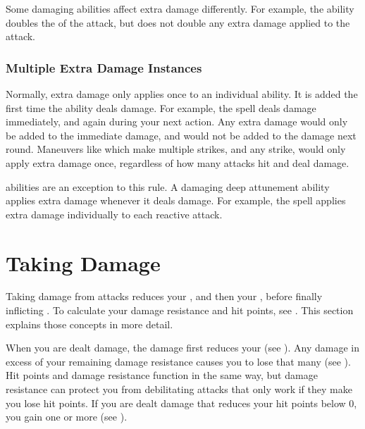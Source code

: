             Some damaging abilities affect extra damage differently.
            For example, the  ability doubles the  of the attack, but does not double any extra damage applied to the attack.

            \subsubsection{Multiple Extra Damage Instances}
                Normally, extra damage only applies once to an individual ability.
                It is added the first time the ability deals damage.
                For example, the  spell deals damage immediately, and again during your next action.
                Any extra damage would only be added to the immediate damage, and would not be added to the damage next round.
                Maneuvers like  which make multiple strikes, and any  strike, would only apply extra damage once, regardless of how many attacks hit and deal damage.

                 abilities are an exception to this rule.
                A damaging deep attunement ability applies extra damage whenever it deals damage.
                For example, the  spell applies extra damage individually to each reactive attack.

\section{Taking Damage}\label{Taking Damage}
    Taking damage from attacks reduces your , and then your , before finally inflicting .
    To calculate your damage resistance and hit points, see .
    This section explains those concepts in more detail.

    When you are dealt damage, the damage first reduces your  (see ).
    Any damage in excess of your remaining damage resistance causes you to lose that many  (see ).
    Hit points and damage resistance function in the same way, but damage resistance can protect you from debilitating attacks that only work if they make you lose hit points.
    If you are dealt damage that reduces your hit points below 0, you gain one or more  (see ).

